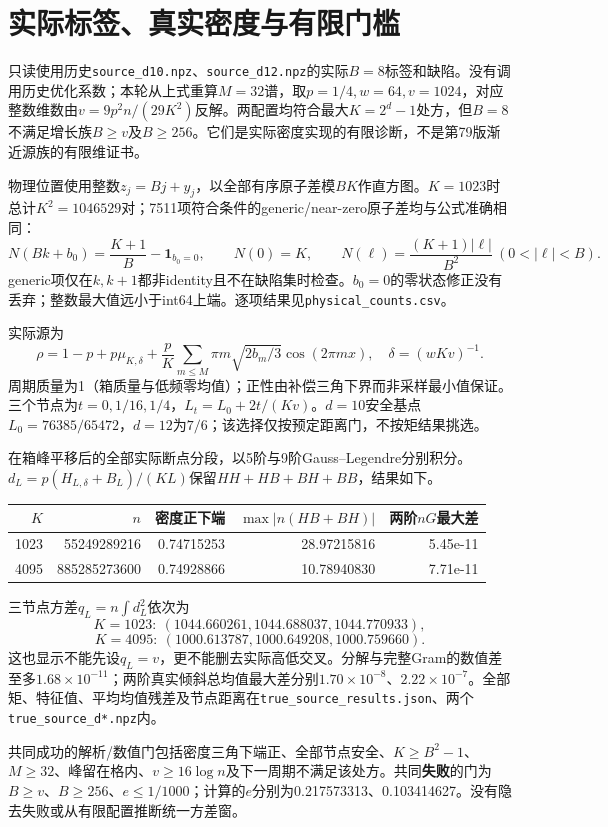 \documentclass[UTF8,a4paper,11pt,fontset=none]{ctexart}
\begin{document}
\section{实际标签、真实密度与有限门槛}
只读使用历史\nolinkurl{source_d10.npz}、\nolinkurl{source_d12.npz}的实际\(B=8\)标签和缺陷。没有调用历史优化系数；本轮从上式重算\(M=32\)谱，取\(p=1/4,w=64,v=1024\)，对应整数维数由\(v=9p^2n/(29K^2)\)反解。两配置均符合最大\(K=2^d-1\)处方，但\(B=8\)不满足增长族\(B\ge v\)及\(B\ge256\)。它们是实际密度实现的有限诊断，不是第79版渐近源族的有限维证书。

物理位置使用整数\(z_j=Bj+y_j\)，以全部有序原子差模\(BK\)作直方图。\(K=1023\)时总计\(K^2=1046529\)对；7511项符合条件的generic/near-zero原子差均与公式准确相同：
\[
N(Bk+b_0)=\frac{K+1}{B}-\mathbf1_{b_0=0},\qquad
N(0)=K,\qquad N(\ell)=\frac{(K+1)|\ell|}{B^2}\ (0<|\ell|<B).
\]
generic项仅在\(k,k+1\)都非identity且不在缺陷集时检查。\(b_0=0\)的零状态修正没有丢弃；整数最大值远小于int64上端。逐项结果见\nolinkurl{physical_counts.csv}。

实际源为
\[
\rho=1-p+p\mu_{K,\delta}+\frac pK\sum_{m\le M}\pi m\sqrt{2b_m/3}\cos(2\pi mx),\quad
\delta=(wKv)^{-1}.
\]
周期质量为1（箱质量与低频零均值）；正性由补偿三角下界而非采样最小值保证。三个节点为\(t=0,1/16,1/4\)，\(L_t=L_0+2t/(Kv)\)。\(d=10\)安全基点\(L_0=76385/65472\)，\(d=12\)为\(7/6\)；该选择仅按预定距离门，不按矩结果挑选。

在箱峰平移后的全部实际断点分段，以5阶与9阶Gauss--Legendre分别积分。\(d_L=p(H_{L,\delta}+B_L)/(KL)\)保留\(HH+HB+BH+BB\)，结果如下。
\begin{center}\small\begin{tabular}{rrrrr}\toprule
\(K\)&\(n\)&密度正下端&\(\max|n(HB+BH)|\)&两阶\(nG\)最大差\\\midrule
1023 & 55249289216 & 0.74715253 & 28.97215816 & 5.45e-11\\
4095 & 885285273600 & 0.74928866 & 10.78940830 & 7.71e-11\\
\bottomrule\end{tabular}\end{center}
三节点方差\(q_L=n\int d_L^2\)依次为
\[
K=1023:\ (1044.660261,1044.688037,1044.770933),
\]
\[
K=4095:\ (1000.613787,1000.649208,1000.759660).
\]
这也显示不能先设\(q_L=v\)，更不能删去实际高低交叉。分解与完整Gram的数值差至多\(1.68\times10^{-11}\)；两阶真实倾斜总均值最大差分别\(1.70\times10^{-8}\)、\(2.22\times10^{-7}\)。全部矩、特征值、平均均值残差及节点距离在\nolinkurl{true_source_results.json}、两个\nolinkurl{true_source_d*.npz}内。

共同成功的解析/数值门包括密度三角下端正、全部节点安全、\(K\ge B^2-1\)、\(M\ge32\)、峰留在格内、\(v\ge16\log n\)及下一周期不满足该处方。共同\textbf{失败}的门为\(B\ge v\)、\(B\ge256\)、\(e\le1/1000\)；计算的\(e\)分别为0.217573313、0.103414627。没有隐去失败或从有限配置推断统一方差窗。
\end{document}
